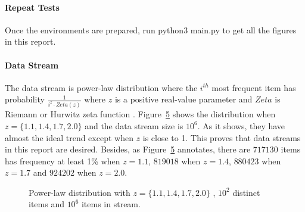 \documentclass[10pt]{article}
\begin{document}
\paragraph{Repeat Tests}
Once the environments are prepared, run python3 main.py to get all the figures in this report.

\paragraph{Data Stream}
The data stream is power-law distribution where 
the $i^{th}$ most frequent item has probability $\frac{1}{i^{z} \cdot{} Zeta(z)}$
where $z$ is a positive real-value parameter and $Zeta$ is Riemann or Hurwitz zeta function \cite{zeta}. 
Figure~\ref{powerlaw} shows the distribution when $z = \{1.1, 1.4, 1.7, 2.0\}$ and the data stream size is $10^6$.
As it shows, they have almost the ideal trend except when $z$ is close to 1. 
This proves that data streams in this report are desired.
Besides, as Figure~\ref{powerlaw} annotates, there are $717130$ items has frequency at least 1\% when $z=1.1$,  
$819018$ when  $z=1.4$, $880423$ when $z=1.7$ and $924202$ when $z=2.0$.


\begin{figure}[H]
     \begin{subfigure}[b]{0.5\textwidth}
          \centering
          \label{power-law-z-1.1-100-stream-1000000}
    \end{subfigure}
    \begin{subfigure}[b]{0.5\textwidth}
          \centering
          \label{power-law-z-1.4-100-stream-1000000}
    \end{subfigure}
    \begin{subfigure}[b]{0.5\textwidth}
          \centering
          \label{power-law-z-1.7-100-stream-1000000}
    \end{subfigure}
    \begin{subfigure}[b]{0.5\textwidth}
          \centering
          \label{power-law-z-2.0-100-stream-1000000}
    \end{subfigure}
 
    \caption{Power-law distribution with $z = \{1.1, 1.4, 1.7, 2.0\}$ , $10^2$ distinct items and $10^6$ items in stream.}
    \label{powerlaw}
\end{figure}
\end{document}
